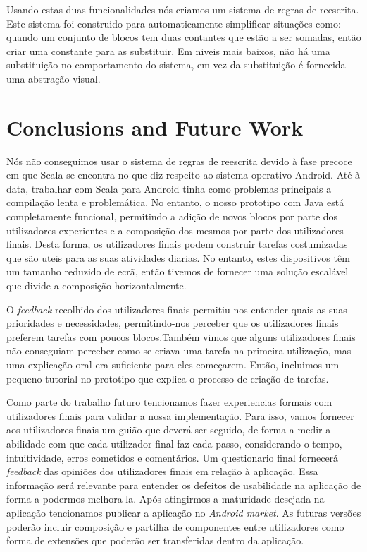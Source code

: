 \documentclass[9pt,a4paper]{extarticle}
\begin{document}
\begin{multicols}{2}
Usando estas duas funcionalidades nós criamos um sistema de regras de reescrita. Este sistema foi construido para automaticamente simplificar situações como: quando um conjunto de blocos tem duas contantes que estão a ser somadas, então criar uma constante para as substituir. Em niveis mais baixos, não há uma substituição no comportamento do sistema, em vez da substituição é fornecida uma abstração visual.

\section{Conclusions and Future Work}\label{sec:conclui}

Nós não conseguimos usar o sistema de regras de reescrita devido à fase precoce em que Scala se encontra no que diz respeito ao sistema operativo Android. Até à data, trabalhar com Scala para Android tinha como problemas principais a compilação lenta e problemática. No entanto, o nosso prototipo com Java está completamente funcional, permitindo a adição de novos blocos por parte dos utilizadores experientes e a composição dos mesmos por parte dos utilizadores finais.
Desta forma, os utilizadores finais podem construir tarefas costumizadas que são uteis para as suas atividades diarias. No entanto, estes dispositivos têm um tamanho reduzido de ecrã, então tivemos de fornecer uma solução escalável que divide a composição horizontalmente.

O \emph{feedback} recolhido dos utilizadores finais permitiu-nos entender quais as suas prioridades e necessidades, permitindo-nos perceber que os utilizadores finais preferem tarefas com poucos blocos.Também vimos que alguns utilizadores finais não conseguiam perceber como se criava uma tarefa na primeira utilização, mas uma explicação oral era suficiente para eles começarem. Então, incluimos um pequeno tutorial no prototipo que explica o processo de criação de tarefas.

Como parte do trabalho futuro tencionamos fazer experiencias formais com utilizadores finais para validar a nossa implementação. Para isso, vamos fornecer aos utilizadores finais um guião que deverá ser seguido, de forma a medir a abilidade com que cada utilizador final faz cada passo, considerando o tempo, intuitividade, erros cometidos e comentários. Um questionario final fornecerá \emph{feedback} das opiniões dos utilizadores finais em relação à aplicação. Essa informação será relevante para entender os defeitos de usabilidade na aplicação de forma a podermos melhora-la. Após atingirmos a maturidade desejada na aplicação tencionamos publicar a aplicação no \emph{Android market}. As futuras versões poderão incluir composição e partilha de componentes entre utilizadores como forma de extensões que poderão ser transferidas dentro da aplicação.



\end{multicols}
\end{document}
